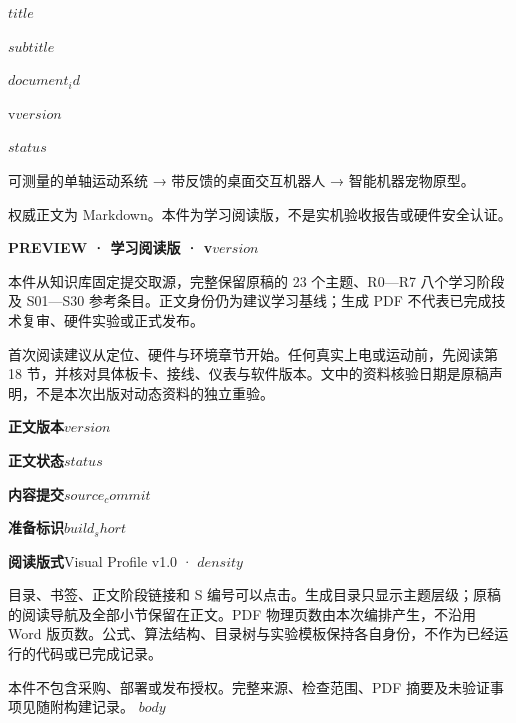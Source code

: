 \documentclass[UTF8,fontset=none,scheme=plain,11pt,a4paper,oneside,openany]{kbbook}
\begin{document}
\pagestyle{empty}
\pagecolor{PreviewNavy}\color{white}
\vspace*{30mm}
\begin{flushleft}{\sffamily\bfseries\fontsize{29}{38}\selectfont $title$\par}\end{flushleft}
\vspace{8mm}
{\sffamily\large $subtitle$\par}
\vfill
{\sffamily\small $document_id$\par\medskip v$version$\par\medskip $status$\par}
\vspace{10mm}
{\small 可测量的单轴运动系统 → 带反馈的桌面交互机器人 → 智能机器宠物原型。\par\medskip 权威正文为 Markdown。本件为学习阅读版，不是实机验收报告或硬件安全认证。\par}
\clearpage\nopagecolor\color{PreviewInk}\pagestyle{fancy}
\noindent\textbf{PREVIEW · 学习阅读版 · v$version$}

本件从知识库固定提交取源，完整保留原稿的 23 个主题、R0—R7 八个学习阶段及 S01—S30 参考条目。正文身份仍为建议学习基线；生成 PDF 不代表已完成技术复审、硬件实验或正式发布。

\medskip
首次阅读建议从定位、硬件与环境章节开始。任何真实上电或运动前，先阅读第 18 节，并核对具体板卡、接线、仪表与软件版本。文中的资料核验日期是原稿声明，不是本次出版对动态资料的独立重验。

\medskip
\noindent\textbf{正文版本}\quad $version$\par
\noindent\textbf{正文状态}\quad $status$\par
\noindent\textbf{内容提交}\quad\texttt{$source_commit$}\par
\noindent\textbf{准备标识}\quad\texttt{$build_short$}\par
\noindent\textbf{阅读版式}\quad Visual Profile v1.0 · $density$\par

\medskip
目录、书签、正文阶段链接和 S 编号可以点击。生成目录只显示主题层级；原稿的阅读导航及全部小节保留在正文。PDF 物理页数由本次编排产生，不沿用 Word 版页数。公式、算法结构、目录树与实验模板保持各自身份，不作为已经运行的代码或已完成记录。

\medskip
本件不包含采购、部署或发布授权。完整来源、检查范围、PDF 摘要及未验证事项见随附构建记录。
\clearpage
\setcounter{tocdepth}{$toc_depth$}
\tableofcontents
\clearpage
$body$
\end{document}
